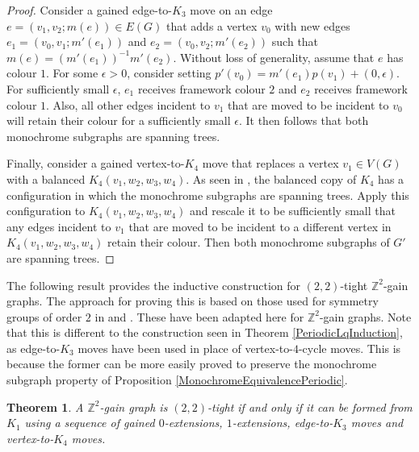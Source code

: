 \documentclass[reqno,a4paper,10pt]{article}
\newtheorem{theorem}{Theorem}[section]
\theoremstyle{definition}
\theoremstyle{remark}
\numberwithin{equation}{section}
\numberwithin{figure}{section}
\numberwithin{table}{section}
\newcommand{\Z}{\mathbb{Z}}
\begin{document}
\begin{proof}
		Consider a gained edge-to-$K_3$ move on an edge $e=(v_1,v_2;m(e))\in E(G)$ that adds a vertex $v_0$ with new edges $e_1=(v_0,v_1;m'(e_1))$ and $e_2=(v_0,v_2;m'(e_2))$ such that $m(e)=(m'(e_1))^{-1}m'(e_2)$. Without loss of generality, assume that $e$ has colour $1$. For some $\epsilon>0$, consider setting $p'(v_0)=m'(e_1)p(v_1)+(0,\epsilon)$. For sufficiently small $\epsilon$, $e_1$ receives framework colour $2$ and $e_2$ receives framework colour $1$. Also, all other edges incident to $v_1$ that are moved to be incident to $v_0$ will retain their colour for a sufficiently small $\epsilon$. It then follows that both monochrome subgraphs are spanning trees.
		
		Finally, consider a gained vertex-to-$K_4$ move that replaces a vertex $v_1\in V(G)$ with a balanced $K_4(v_1,w_2,w_3,w_4)$. As seen in \cite[Example 4.5]{NonEuclidean}, the balanced copy of $K_4$ has a configuration in which the monochrome subgraphs are spanning trees. Apply this configuration to $K_4(v_1,w_2,w_3,w_4)$ and rescale it to be sufficiently small that any edges incident to $v_1$ that are moved to be incident to a different vertex in $K_4(v_1,w_2,w_3,w_4)$ retain their colour. Then both monochrome subgraphs of $G'$ are spanning trees.
	\end{proof}
    The following result provides the inductive construction for $(2,2)$-tight $\Z^2$-gain graphs. The approach for proving this is based on those used for symmetry groups of order $2$ in \cite[Theorem 22]{GridLike} and \cite[Theorem 15]{Surfaces}. These have been adapted here for $\Z^2$-gain graphs. Note that this is different to the construction seen in Theorem \ref{PeriodicLqInduction}, as edge-to-$K_3$ moves have been used in place of vertex-to-$4$-cycle moves. This is because the former can be more easily proved to preserve the monochrome subgraph property of Proposition \ref{MonochromeEquivalencePeriodic}.
    \begin{theorem}\label{PolyPeriodicInduction}
		A $\Z^2$-gain graph is $(2,2)$-tight if and only if it can be formed from $K_1$ using a sequence of gained $0$-extensions, $1$-extensions, edge-to-$K_3$ moves and vertex-to-$K_4$ moves.
	\end{theorem}
\end{document}
